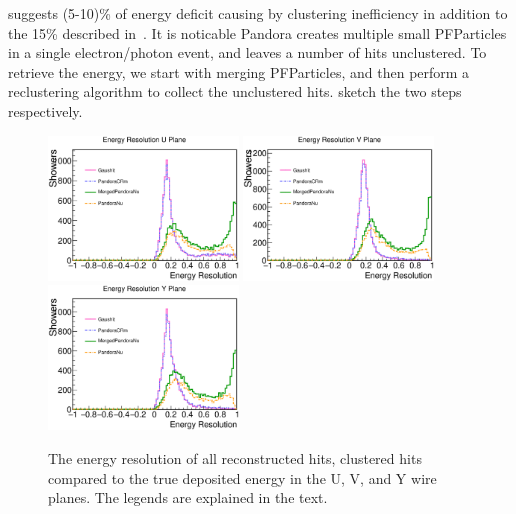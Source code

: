  suggests (5-10)\% of energy deficit 
causing by clustering
inefficiency in addition to the 15\% described in~.
It is noticable Pandora creates multiple small PFParticles in 
a single electron/photon event, and leaves a number of hits unclustered.
To retrieve the energy, we start with merging PFParticles, and then
perform a reclustering algorithm to collect the unclustered hits.
 sketch the two steps respectively.\\

\begin{figure}[htbp]
\begin{center}
\includegraphics[width=0.45\textwidth]{figs/ongoing/clustering/EnergyResU.eps}
\includegraphics[width=0.45\textwidth]{figs/ongoing/clustering/EnergyResV.eps}
\includegraphics[width=0.45\textwidth]{figs/ongoing/clustering/EnergyResY.eps}
\caption{The energy resolution of all reconstructed hits, clustered hits 
compared to the
true deposited energy in the U, V, and Y wire planes.
The legends are explained in the text.}
\label{fig:clustering_deficiency}
\end{center}
\end{figure}

